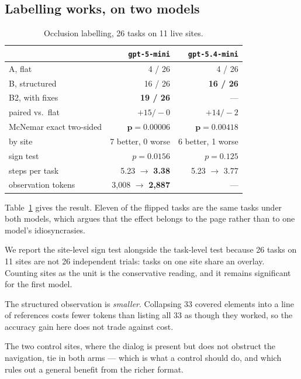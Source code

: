 \documentclass[conference]{IEEEtran}
\begin{document}
\subsection{Labelling works, on two models}

\begin{table}[t]
\caption{Occlusion labelling, 26 tasks on 11 live sites.}
\label{tab:main}
\centering
\begin{tabular}{@{}lrr@{}}
\toprule
 & \texttt{gpt-5-mini} & \texttt{gpt-5.4-mini} \\
\midrule
A, flat                   & 4 / 26  & 4 / 26 \\
B, structured             & 16 / 26 & \textbf{16 / 26} \\
B2, with fixes            & \textbf{19 / 26} & --- \\
\midrule
paired vs.\ flat          & $+15/-0$ & $+14/-2$ \\
McNemar exact two-sided   & $\mathbf{p = 0.00006}$ & $\mathbf{p = 0.00418}$ \\
by site                   & 7 better, 0 worse & 6 better, 1 worse \\
sign test                 & $p = 0.0156$ & $p = 0.125$ \\
\midrule
steps per task            & 5.23 $\to$ \textbf{3.38} & 5.23 $\to$ 3.77 \\
observation tokens        & 3{,}008 $\to$ \textbf{2{,}887} & --- \\
\bottomrule
\end{tabular}
\end{table}

Table~\ref{tab:main} gives the result. Eleven of the flipped tasks are the same
tasks under both models, which argues that the effect belongs to the page
rather than to one model's idiosyncrasies.

We report the site-level sign test alongside the task-level test because 26
tasks on 11 sites are not 26 independent trials: tasks on one site share an
overlay. Counting sites as the unit is the conservative reading, and it remains
significant for the first model.

The structured observation is \emph{smaller}. Collapsing 33 covered elements
into a line of references costs fewer tokens than listing all 33 as though they
worked, so the accuracy gain here does not trade against cost.

The two control sites, where the dialog is present but does not obstruct the
navigation, tie in both arms --- which is what a control should do, and which
rules out a general benefit from the richer format.
\end{document}
